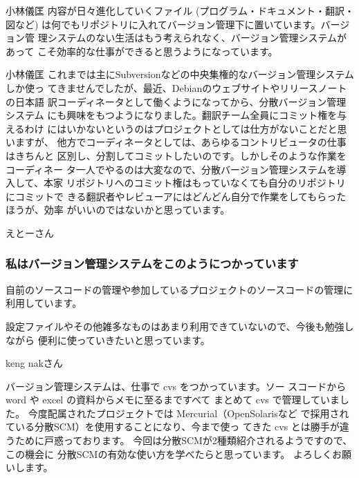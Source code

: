 \documentclass[cjk,dvipdfmx,12pt]{beamer}
\begin{document}
\begin{frame}{小林儀匡}
内容が日々進化していくファイル (プログラム・ドキュメント・翻訳・図など) 
は何でもリポジトリに入れてバージョン管理下に置いています。バージョン管
理システムのない生活はもう考えられなく、バージョン管理システムがあって
こそ効率的な仕事ができると思うようになっています。
\end{frame}\begin{frame}{小林儀匡}
これまでは主にSubversionなどの中央集権的なバージョン管理システムしか使っ
てきませんでしたが、最近、Debianのウェブサイトやリリースノートの日本語
訳コーディネータとして働くようになってから、分散バージョン管理システム
にも興味をもつようになりました。翻訳チーム全員にコミット権を与えるわけ
にはいかないというのはプロジェクトとしては仕方がないことだと思いますが、
他方でコーディネータとしては、あらゆるコントリビュータの仕事はきちんと
区別し、分割してコミットしたいのです。しかしそのような作業をコーディネー
タ一人でやるのは大変なので、分散バージョン管理システムを導入して、本家
リポジトリへのコミット権はもっていなくても自分のリポジトリにコミットで
きる翻訳者やレビューアにはどんどん自分で作業をしてもらったほうが、効率
がいいのではないかと思っています。

\end{frame}\begin{frame}{えとーさん}

\subsubsection{私はバージョン管理システムをこのようにつかっています}


自前のソースコードの管理や参加しているプロジェクトのソースコードの管理に
利用しています。

設定ファイルやその他雑多なものはあまり利用できていないので、今後も勉強しながら
便利に使っていきたいと思っています。


\end{frame}\begin{frame}{keng nakさん}

バージョン管理システムは、仕事で cvs をつかっています。ソー
スコードから word や excel の資料からメモに至るまですべて
まとめて cvs で管理していました。
今度配属されたプロジェクトでは Mercurial（OpenSolarisなど
で採用されている分散SCM）を使用することになり、今まで使っ
てきた cvs とは勝手が違うために戸惑っております。
今回は分散SCMが2種類紹介されるようですので、この機会に
分散SCMの有効な使い方を学べたらと思っています。
よろしくお願いします。


\end{frame}
\end{document}
